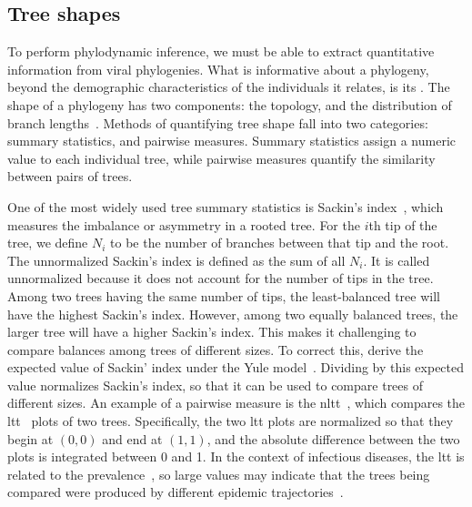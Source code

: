 \subsection{Tree shapes}
\label{subsec:treeshape}

To perform phylodynamic inference, we must be able to extract quantitative
information from viral phylogenies. What is informative about a phylogeny,
beyond the demographic characteristics of the individuals it relates, is its
. The shape of a phylogeny has two components: the topology, and
the distribution of branch lengths~\autocite{mooers1997inferring}. Methods of
quantifying tree shape fall into two categories: summary statistics, and
pairwise measures. Summary statistics assign a numeric value to each individual
tree, while pairwise measures quantify the similarity between pairs of trees. 

One of the most widely used tree summary statistics is Sackin's
index~\autocite{shao1990tree}, which measures the imbalance or asymmetry in a
rooted tree. For the $i$th tip of the tree, we define $N_i$ to be the number of
branches between that tip and the root. The unnormalized Sackin's index is
defined as the sum of all $N_i$. It is called unnormalized because it does not
account for the number of tips in the tree. Among two trees having the same
number of tips, the least-balanced tree will have the highest Sackin's index.
However, among two equally balanced trees, the larger tree will have a higher
Sackin's index. This makes it challenging to compare balances among trees of
different sizes. To correct this, \textcite{kirkpatrick1993searching} derive
the expected value of Sackin' index under the Yule
model~\autocite{yule1925mathematical}. Dividing by this expected value
normalizes Sackin's index, so that it can be used to compare trees of different
sizes. An example of a pairwise measure is the
\gls{nltt}~\autocite{janzen2015approximate}, which compares the
\gls{ltt}~\autocite{nee1992tempo} plots of two trees. Specifically, the two
\gls{ltt} plots are normalized so that they begin at $(0, 0)$ and end at $(1,
1)$, and the absolute difference between the two plots is integrated between 0
and 1. In the context of infectious diseases, the \gls{ltt} is related to the
prevalence~\autocite{holmes1995revealing}, so large values may indicate that
the trees being compared were produced by different epidemic
trajectories~\autocite{janzen2015approximate}.

